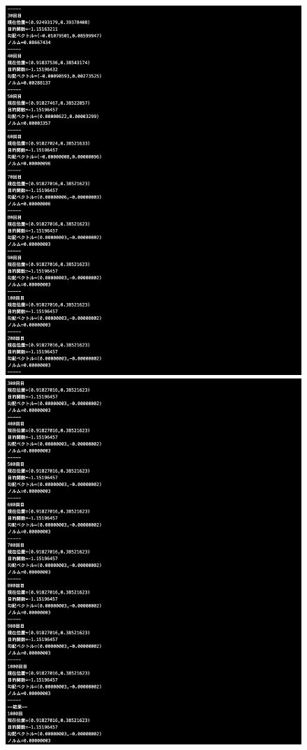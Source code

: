 \documentclass[12pt]{jarticle}
\begin{document}
\begin{figure}[h]
\begin{minipage}{0.5\hsize}
\begin{center}
            \includegraphics[scale=0.2]{kadai1_1s_out1_1_2.png}
        \end{center}
    \end{minipage}
    \begin{center}
        \includegraphics[scale=0.2]{kadai1_1s_out1_1_3.png}

\end{center}
\end{figure}
\end{document}

